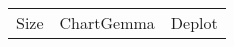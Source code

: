 \begin{table}
 \begin{tabular}{|c|c|c|}
 Size & ChartGemma & Deplot \\
 \end{tabular}
 \caption{}
 \label{tab:plotqa-scores-for-various-sizes}
  \end{table}
